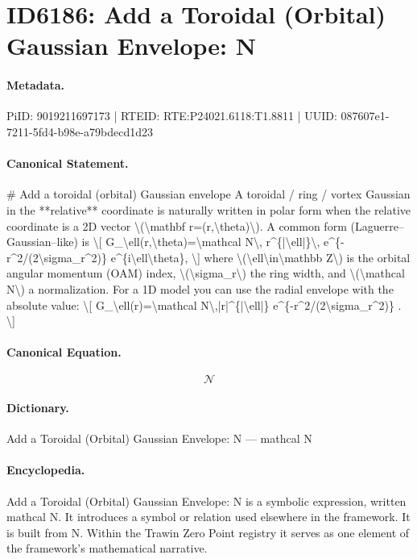 \section*{ID6186: Add a Toroidal (Orbital) Gaussian Envelope: N}
\paragraph{Metadata.}
PiID: 9019211697173 | RTEID: RTE:P24021.6118:T1.8811 | UUID: 087607e1-7211-5fd4-b98e-a79bdecd1d23

\paragraph{Canonical Statement.}
\# Add a toroidal (orbital) Gaussian envelope A toroidal / ring / vortex Gaussian in the **relative** coordinate is naturally written in polar form when the relative coordinate is a 2D vector \textbackslash{}(\textbackslash{}mathbf r=(r,\textbackslash{}theta)\textbackslash{}). A common form (Laguerre–Gaussian–like) is \textbackslash{}[ G\_\textbackslash{}ell(r,\textbackslash{}theta)=\textbackslash{}mathcal N\textbackslash{}, r\textasciicircum{}\{|\textbackslash{}ell|\}\textbackslash{}, e\textasciicircum{}\{-r\textasciicircum{}2/(2\textbackslash{}sigma\_r\textasciicircum{}2)\} e\textasciicircum{}\{i\textbackslash{}ell\textbackslash{}theta\}, \textbackslash{}] where \textbackslash{}(\textbackslash{}ell\textbackslash{}in\textbackslash{}mathbb Z\textbackslash{}) is the orbital angular momentum (OAM) index, \textbackslash{}(\textbackslash{}sigma\_r\textbackslash{}) the ring width, and \textbackslash{}(\textbackslash{}mathcal N\textbackslash{}) a normalization. For a 1D model you can use the radial envelope with the absolute value: \textbackslash{}[ G\_\textbackslash{}ell(r)=\textbackslash{}mathcal N\textbackslash{},|r|\textasciicircum{}\{|\textbackslash{}ell|\} e\textasciicircum{}\{-r\textasciicircum{}2/(2\textbackslash{}sigma\_r\textasciicircum{}2)\} . \textbackslash{}]

\paragraph{Canonical Equation.}
\[
\mathcal N
\]

\paragraph{Dictionary.}
Add a Toroidal (Orbital) Gaussian Envelope: N — mathcal N

\paragraph{Encyclopedia.}
Add a Toroidal (Orbital) Gaussian Envelope: N is a symbolic expression, written mathcal N. It introduces a symbol or relation used elsewhere in the framework. It is built from N. Within the Trawin Zero Point registry it serves as one element of the framework's mathematical narrative.
